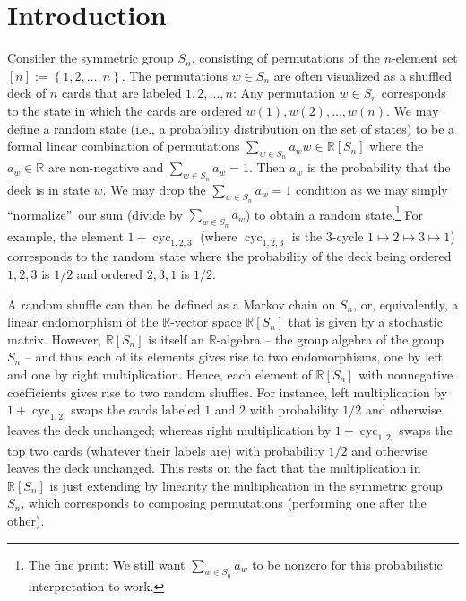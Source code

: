 \documentclass[12pt]{article}
\theoremstyle{definition}%
\theoremstyle{definition}%
\theoremstyle{remark}%
\newcommand{\tup}[1]{\left( #1 \right)}
\newcommand{\interval}[1]{\left[ #1 \right]} %
\newcommand{\set}[1]{\left\{ #1 \right\}}
\newcommand{\cyc}[1]{\operatorname{cyc}_{#1}}
\newcommand{\RR}{\mathbb{R}}
\begin{document}
\section{\label{sec.intro}Introduction}

Consider the symmetric group $S_n$, consisting of permutations of the $n$-element set $\interval{n} := \set{1, 2, \ldots, n}$.
The permutations $w \in S_n$ are often visualized as a shuffled deck of $n$ cards that are labeled $1,2,\dots,n$:
Any permutation $w \in S_n$ corresponds to the state in which the cards are ordered $w\tup{1},w\tup{2},\dots,w\tup{n}$.
We may define a random state (i.e., a probability distribution on the set of states) to be a formal linear combination of permutations $\sum_{w \in S_n} a_{w}w \in \mathbb{R}[S_n]$ where the $a_{w} \in \mathbb{R}$ are non-negative and $\sum_{w \in S_n} a_{w}=1$.
Then $a_{w}$ is the probability that the deck is in state $w$.
We may drop the $\sum_{w \in S_n} a_{w}=1$ condition as we may simply ``normalize''\ our sum (divide by $\sum_{w \in S_n }a_{w}$) to obtain a random state.\footnote{The fine print: We still want $\sum_{w \in S_n} a_w$ to be nonzero for this probabilistic interpretation to work.}
For example, the element $1 + \cyc{1,2,3}$ (where $\cyc{1,2,3}$ is the $3$-cycle $1 \mapsto 2 \mapsto 3 \mapsto 1$) corresponds to the random state where the probability of the deck being ordered $1,2,3$ is $1/2$ and ordered $2,3,1$ is $1/2$.

A random shuffle can then be defined as a Markov chain on $S_n$, or, equivalently, a linear endomorphism of the $\RR$-vector space $\RR[S_n]$ that is given by a stochastic matrix.
However, $\RR[S_n]$ is itself an $\RR$-algebra -- the group algebra of the group $S_n$ -- and thus each of its elements gives rise to two endomorphisms, one by left and one by right multiplication.
Hence, each element of $\RR[S_n]$ with nonnegative coefficients gives rise to two random shuffles.
For instance, left multiplication by $1 + \cyc{1,2}$ swaps the cards labeled $1$ and $2$ with probability $1/2$ and otherwise leaves the deck unchanged; whereas right multiplication by $1 + \cyc{1,2}$ swaps the top two cards (whatever their labels are) with probability $1/2$ and otherwise leaves the deck unchanged.
This rests on the fact that the multiplication in $\RR[S_n]$ is just extending by linearity the multiplication in the symmetric group $S_n$, which corresponds to composing permutations (performing one after the other).

\end{document}
